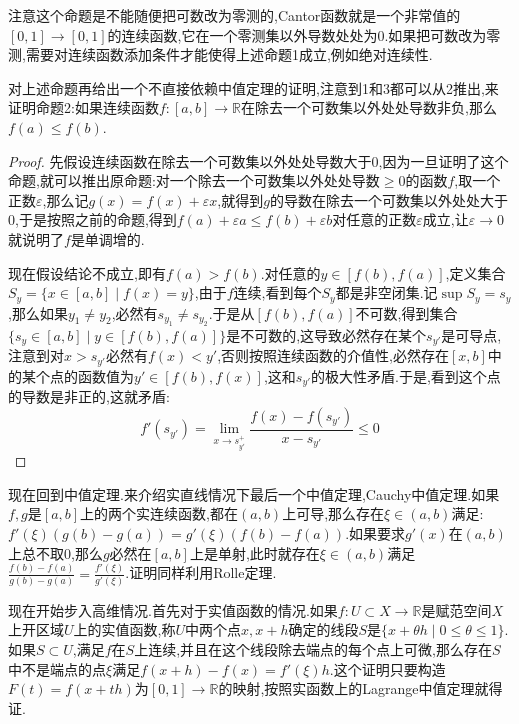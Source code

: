 注意这个命题是不能随便把可数改为零测的,Cantor函数就是一个非常值的$[0,1]\to[0,1]$的连续函数,它在一个零测集以外导数处处为0.如果把可数改为零测,需要对连续函数添加条件才能使得上述命题1成立,例如绝对连续性.

对上述命题再给出一个不直接依赖中值定理的证明,注意到1和3都可以从2推出,来证明命题2:如果连续函数$f:[a,b]\to\mathbb{R}$在除去一个可数集以外处处导数非负,那么$f(a)\le f(b)$.
\begin{proof}
	
	先假设连续函数在除去一个可数集以外处处导数大于0,因为一旦证明了这个命题,就可以推出原命题:对一个除去一个可数集以外处处导数$\ge0$的函数$f$,取一个正数$\varepsilon$,那么记$g(x)=f(x)+\varepsilon x$,就得到$g$的导数在除去一个可数集以外处处大于0,于是按照之前的命题,得到$f(a)+\varepsilon a\le f(b)+\varepsilon b$对任意的正数$\varepsilon$成立,让$\varepsilon\to0$就说明了$f$是单调增的.
	
	现在假设结论不成立,即有$f(a)>f(b)$.对任意的$y\in[f(b),f(a)]$,定义集合$S_y=\{x\in[a,b]\mid f(x)=y\}$,由于$f$连续,看到每个$S_y$都是非空闭集.记$\sup S_y=s_y$,那么如果$y_1\not=y_2$,必然有$s_{y_1}\not=s_{y_2}$.于是从$[f(b),f(a)]$不可数,得到集合$\{s_y\in[a,b]\mid y\in[f(b),f(a)]\}$是不可数的,这导致必然存在某个$s_{y'}$是可导点,注意到对$x>s_{y'}$必然有$f(x)<y'$,否则按照连续函数的介值性,必然存在$[x,b]$中的某个点的函数值为$y'\in[f(b),f(x)]$,这和$s_{y'}$的极大性矛盾.于是,看到这个点的导数是非正的,这就矛盾:
	$$f'(s_{y'})=\lim_{x\to s_{y'}^+}\frac{f(x)-f(s_{y'})}{x-s_{y'}}\le0$$
	
\end{proof}

现在回到中值定理.来介绍实直线情况下最后一个中值定理,Cauchy中值定理.如果$f,g$是$[a,b]$上的两个实连续函数,都在$(a,b)$上可导,那么存在$\xi\in(a,b)$满足:$f'(\xi)(g(b)-g(a))=g'(\xi)(f(b)-f(a))$.如果要求$g'(x)$在$(a,b)$上总不取0,那么$g$必然在$[a,b]$上是单射,此时就存在$\xi\in(a,b)$满足$\frac{f(b)-f(a)}{g(b)-g(a)}=\frac{f'(\xi)}{g'(\xi)}$.证明同样利用Rolle定理.

现在开始步入高维情况.首先对于实值函数的情况.如果$f:U\subset X\to\mathbb{R}$是赋范空间$X$上开区域$U$上的实值函数,称$U$中两个点$x,x+h$确定的线段$S$是$\{x+\theta h\mid 0\le\theta\le1\}$.如果$S\subset U$,满足$f$在$S$上连续,并且在这个线段除去端点的每个点上可微,那么存在$S$中不是端点的点$\xi$满足$f(x+h)-f(x)=f'(\xi)h$.这个证明只要构造$F(t)=f(x+th)$为$[0,1]\to\mathbb{R}$的映射,按照实函数上的Lagrange中值定理就得证.

